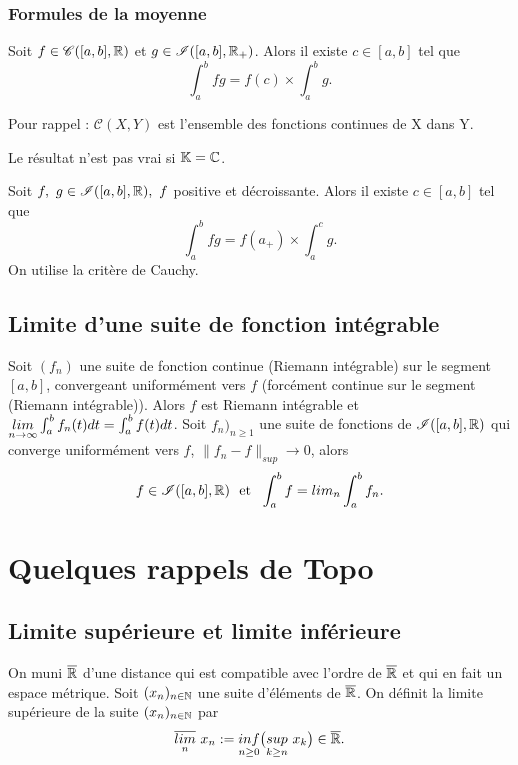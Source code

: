 \subsubsection{Formules de la moyenne}
Soit $f \in \mathscr{C}([a,b], \mathbb{R})$ et $g \in  \mathscr{I}([a,b],\mathbb{R}_+)$. Alors il existe $c \in [a,b]$ tel que $$\int_a^b fg = f(c) \times \int_a^b g.$$
\ep

Pour rappel : $\mathscr{C}(X,Y)$ est l'ensemble des fonctions continues de X dans Y.

\bw
Le résultat n'est pas vrai si $\mathbb{K} = \mathbb{C}$.
\ew

Soit $f,~g \in \mathscr{I}([a,b],\mathbb{R}), ~ f$ positive et décroissante. Alors il existe $c \in [a,b]$ tel que $$\int_a^b fg = f(a_+) \times \int_a^c g.$$
\ep
\bpf
On utilise la critère de Cauchy.
\epf

\subsection{Limite d'une suite de fonction intégrable}
\bp
Soit $(f_n)$ une suite de fonction continue (Riemann intégrable) sur le segment $[a,b]$, convergeant uniformément vers $f$ (forcément continue sur le segment (Riemann intégrable)). Alors $f$ est Riemann intégrable et $\underset{n \to \infty}{lim} \int_a^b f_n(t)dt = \int_a^b f(t)dt$.
\ep
{}
Soit $f_n)_{n\geq 1}$ une suite de fonctions de $\mathscr{I}([a,b],\mathbb{R})$ qui converge uniformément vers $f$, \ie $\| f_n - f \|_{sup} \to 0$, alors $$f \in \mathscr{I}([a,b],\mathbb{R}) ~ \text{ et } ~ \int_a^b f = lim_n \int_a^b f_n.$$
\ep

\newpage

\section{Quelques rappels de Topo}
\subsection{Limite supérieure et limite inférieure}
On muni $\overline{\mathbb{R}}$ d'une distance qui est compatible avec l'ordre de $\overline{\mathbb{R}}$ et qui en fait un espace métrique.
Soit $(x_n)_{n \in \mathbb{N}}$ une suite d'éléments de $\overline{\mathbb{R}}$. On définit la limite supérieure de la suite $(x_n)_{n\in\mathbb{N}}$ par $$\overline{\underset{n}{lim}} ~ x_n := \underset{n \geq 0}{inf} \big(\underset{k \geq n}{sup}~x_k\big
	) \in \overline{\mathbb{R}}.$$
\ed

